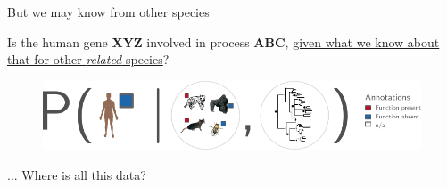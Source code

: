 \documentclass[aspectratio=169,9pt,handout]{beamer}
\begin{document}
\begin{frame}[c]
{\begin{minipage}[t]{.33\linewidth}
		But we may know from other species
	\end{minipage}}\hfill
	\hfill
	
\bigskip{}

\end{frame}

\begin{frame}[c,label=aphylo-prob-diagram]
	\begin{center}
		\normalsize Is the human gene \textbf{XYZ} involved in process \textbf{ABC}, \uline{given what we know about that for other \textit{related} species}?
	\end{center}
	
	\begin{figure}
		\includegraphics[width=.9\linewidth]{aphylo-data-probability.pdf}
	\end{figure}\pause
	\Large \bigskip\hfill... Where is all this data?\normalsize


\vfill\hfill\hyperlink{aphylographicalview}{}

\end{frame}
\end{document}
